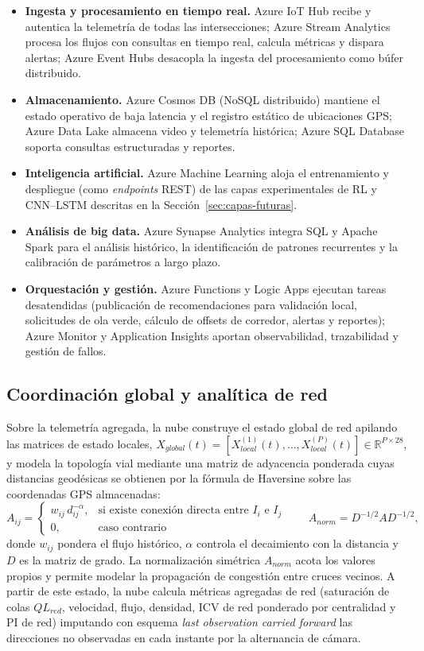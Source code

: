 \begin{itemize}
\item \textbf{Ingesta y procesamiento en tiempo real.} Azure IoT Hub recibe y autentica la
  telemetría de todas las intersecciones; Azure Stream Analytics procesa los flujos con
  consultas en tiempo real, calcula métricas y dispara alertas; Azure Event Hubs desacopla la
  ingesta del procesamiento como búfer distribuido.
\item \textbf{Almacenamiento.} Azure Cosmos DB (NoSQL distribuido) mantiene el estado operativo
  de baja latencia y el registro estático de ubicaciones GPS; Azure Data Lake almacena video y
  telemetría histórica; Azure SQL Database soporta consultas estructuradas y reportes.
\item \textbf{Inteligencia artificial.} Azure Machine Learning aloja el entrenamiento y
  despliegue (como \emph{endpoints} REST) de las capas experimentales de RL y CNN--LSTM
  descritas en la Sección~\ref{sec:capas-futuras}.
\item \textbf{Análisis de big data.} Azure Synapse Analytics integra SQL y Apache Spark para el
  análisis histórico, la identificación de patrones recurrentes y la calibración de parámetros a
  largo plazo.
\item \textbf{Orquestación y gestión.} Azure Functions y Logic Apps ejecutan tareas
  desatendidas (publicación de recomendaciones para validación local, solicitudes de ola verde,
  cálculo de offsets de corredor, alertas y reportes); Azure Monitor y Application Insights
  aportan observabilidad, trazabilidad y gestión de fallos.
\end{itemize}

\subsection{Coordinación global y analítica de red}\label{subsec:coordinacion-global}

Sobre la telemetría agregada, la nube construye el estado global de red apilando las matrices de
estado locales, $X_{global}(t)=[X_{local}^{(1)}(t),\ldots,X_{local}^{(P)}(t)]\in\mathbb{R}^{P\times 28}$,
y modela la topología vial mediante una matriz de adyacencia ponderada cuyas distancias
geodésicas se obtienen por la fórmula de Haversine sobre las coordenadas GPS almacenadas:
\[
A_{ij}=
\begin{cases}
w_{ij}\,d_{ij}^{-\alpha}, & \text{si existe conexión directa entre } I_i \text{ e } I_j\\[2pt]
0, & \text{caso contrario}
\end{cases}
\qquad
A_{norm}=D^{-1/2}AD^{-1/2},
\]
donde $w_{ij}$ pondera el flujo histórico, $\alpha$ controla el decaimiento con la distancia y
$D$ es la matriz de grado. La normalización simétrica $A_{norm}$ acota los valores propios y
permite modelar la propagación de congestión entre cruces vecinos. A partir de este estado, la
nube calcula métricas agregadas de red (saturación de colas $QL_{red}$, velocidad, flujo,
densidad, ICV de red ponderado por centralidad y PI de red) imputando con esquema \emph{last
observation carried forward} las direcciones no observadas en cada instante por la alternancia
de cámara.

